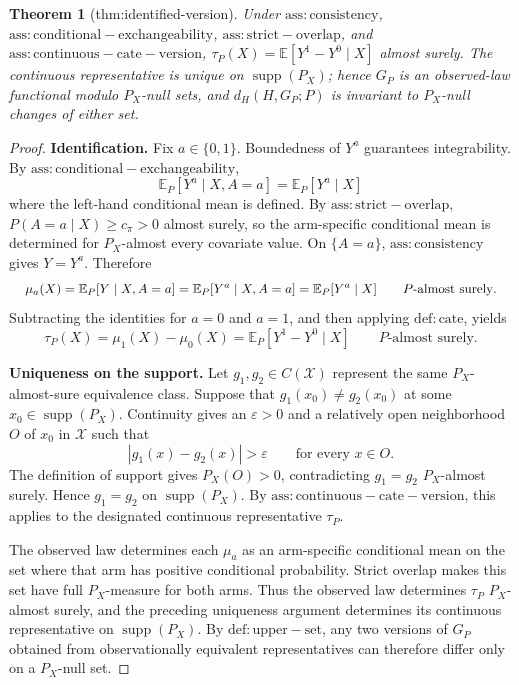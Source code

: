 \documentclass{article}
\newtheorem{theorem}{Theorem}
\begin{document}
\begin{theorem}[thm:identified-version]\label{thm:identified-version}
Under \(\mathrm{ass:consistency}\), \(\mathrm{ass:conditional-exchangeability}\), \(\mathrm{ass:strict-overlap}\), and \(\mathrm{ass:continuous-cate-version}\), \(\tau_P(X)=\mathbb E[Y^1-Y^0\mid X]\) almost surely. The continuous representative is unique on \(\operatorname{supp}(P_X)\); hence \(G_P\) is an observed-law functional modulo \(P_X\)-null sets, and \(d_H(H,G_P;P)\) is invariant to \(P_X\)-null changes of either set.
\end{theorem}
\begin{proof}
\textbf{Identification.} Fix \(a\in\{0,1\}\). Boundedness of \(Y^a\) guarantees integrability. By \(\mathrm{ass:conditional-exchangeability}\),
\[
 \mathbb E_P[Y^a\mid X,A=a]=\mathbb E_P[Y^a\mid X]
\]
where the left-hand conditional mean is defined. By \(\mathrm{ass:strict-overlap}\), \(P(A=a\mid X)\ge c_\pi>0\) almost surely, so the arm-specific conditional mean is determined for \(P_X\)-almost every covariate value. On \(\{A=a\}\), \(\mathrm{ass:consistency}\) gives \(Y=Y^a\). Therefore
\[
\makebox[\linewidth][c]{\resizebox{0.98\linewidth}{!}{\(\displaystyle \mu_a(X)
 =\mathbb E_P[Y\mid X,A=a]
 =\mathbb E_P[Y^a\mid X,A=a]
 =\mathbb E_P[Y^a\mid X]
 \qquad P\text{-almost surely}.\)}}
\]
Subtracting the identities for \(a=0\) and \(a=1\), and then applying \(\mathrm{def:cate}\), yields
\[
 \tau_P(X)
 =\mu_1(X)-\mu_0(X)
 =\mathbb E_P[Y^1-Y^0\mid X]
 \qquad P\text{-almost surely}.
\]

\textbf{Uniqueness on the support.} Let \(g_1,g_2\in C(\mathcal X)\) represent the same \(P_X\)-almost-sure equivalence class. Suppose that \(g_1(x_0)\ne g_2(x_0)\) at some \(x_0\in\operatorname{supp}(P_X)\). Continuity gives an \(\varepsilon>0\) and a relatively open neighborhood \(O\) of \(x_0\) in \(\mathcal X\) such that
\[
 |g_1(x)-g_2(x)|>\varepsilon
 \qquad\text{for every }x\in O.
\]
The definition of support gives \(P_X(O)>0\), contradicting \(g_1=g_2\) \(P_X\)-almost surely. Hence \(g_1=g_2\) on \(\operatorname{supp}(P_X)\). By \(\mathrm{ass:continuous-cate-version}\), this applies to the designated continuous representative \(\tau_P\).

The observed law determines each \(\mu_a\) as an arm-specific conditional mean on the set where that arm has positive conditional probability. Strict overlap makes this set have full \(P_X\)-measure for both arms. Thus the observed law determines \(\tau_P\) \(P_X\)-almost surely, and the preceding uniqueness argument determines its continuous representative on \(\operatorname{supp}(P_X)\). By \(\mathrm{def:upper-set}\), any two versions of \(G_P\) obtained from observationally equivalent representatives can therefore differ only on a \(P_X\)-null set.


\end{proof}
\end{document}
